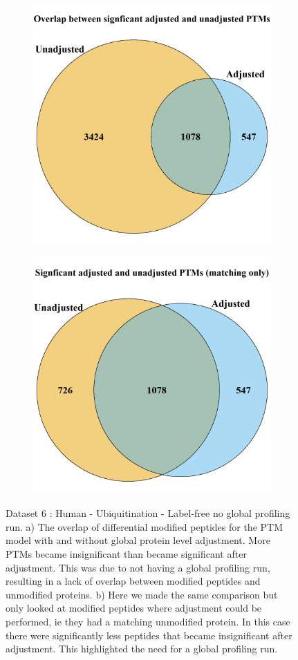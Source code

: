 \documentclass[mcp]{article}
\numberwithin{table}{section}
\begin{document}
\begin{figure}[h!]
\centering
 \begin{subfigure}{\textwidth}
 \centering
	\includegraphics[height=.525\textwidth]{images/usp30_venn_diagramm}
	\caption{}
	\label{fig:data6_vd1}
 \end{subfigure}
 \begin{subfigure}{\textwidth}
 \centering
	\includegraphics[height=.525\textwidth]{images/usp30_venn_diagramm_matching_only}
	\caption{}
	\label{fig:data6_vd2}
 \end{subfigure}
 \caption{Dataset 6 : Human - Ubiquitination - Label-free no global profiling run. a) The overlap of differential modified peptides for the PTM model with and without global protein level adjustment. More PTMs became insignificant than became significant after adjustment. This was due to not having a global profiling run, resulting in a lack of overlap between modified peptides and unmodified proteins. b) Here we made the same comparison but only looked at modified peptides where adjustment could be performed, ie they had a matching unmodified protein. In this case there were significantly less peptides that became insignificant after adjustment. This highlighted the need for a global profiling run.}
\label{fig:data6_plots}
\end{figure}
\end{document}
